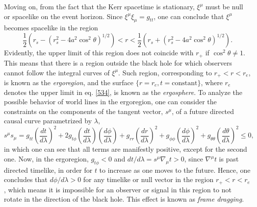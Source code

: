 \documentclass[
12pt,		%
openright,	%
twoside,  %
a4paper,			%
chapter=TITLE,		%
english,			%
french,				%
spanish,			%
brazil				%
]{USPSC-classe/USPSC}
\begin{document}
Moving on, from the fact that the Kerr spacetime is stationary, $\xi^{\mu}$ must be null or spacelike on the event horizon. Since $\xi^{\mu}\xi_{\mu}=g_{tt}$, one can conclude that $\xi^{\mu}$ becomes spacelike in the region 
\begin{equation}\label{534}
    \frac{1}{2}\left(r_s-\left(r_s^2-4a^2\cos^2{\theta}\right)^{1/2}\right)<r<\frac{1}{2}\left(r_s+\left(r_s^2-4a^2\cos^2{\theta}\right)^{1/2}\right).
\end{equation}
Evidently, the upper limit of this region does not coincide with $r_+$ if $\cos^2{\theta}\neq 1$. This means that there is a region outside the black hole for which observers cannot follow the integral curves of $\xi^{\mu}$. Such region, corresponding to $r_+<r<r_e$, is known as the \textit{ergoregion}, and the surface $\{r=r_e,t=\text{constant}\}$, where $r_e$ denotes the upper limit in eq. \ref{534}, is known as the \textit{ergosphere}. To analyze the possible behavior of world lines in the ergoregion, one can consider the constraints on the components of the tangent vector, $s^{\mu}$, of a future directed causal curve parametrized by $\lambda$,
\begin{equation}
    s^{\mu}s_{\mu}=g_{tt}\left(\frac{dt}{d\lambda}\right)^2+2g_{t\phi}\left(\frac{dt}{d\lambda}\right)\left(\frac{d\phi}{d\lambda}\right)+g_{rr}\left(\frac{dr}{d\lambda}\right)^2+g_{\phi\phi}\left(\frac{d\phi}{d\lambda}\right)^2+g_{\theta\theta}\left(\frac{d\theta}{d\lambda}\right)^2\leq0,
\end{equation}
in which one can see that all terms are manifestly positive, except for the second one. Now, in the ergoregion, $g_{t\phi}<0$ and $dt/d\lambda=s^{\mu}\nabla_{\mu}t>0$, since $\nabla^{\mu}t$ is past directed timelike, in order for $t$ to increase as one moves to the future. Hence, one concludes that $d\phi/d\lambda>0$ for any timelike or null vector in the region $r_+<r<r_e$, which means it is impossible for an observer or signal in this region to not rotate in the direction of the black hole. This effect is known as \textit{frame dragging}.
\end{document}
